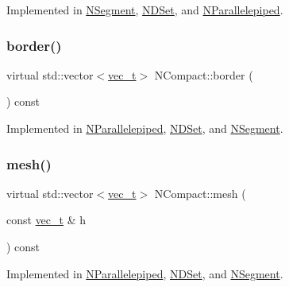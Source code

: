 Implemented in \mbox{\hyperlink{class_n_segment_a2fbe9d64e08f8aaa60d09ba8fe0ca2ba}{N\+Segment}}, \mbox{\hyperlink{class_n_d_set_a683386499ad6a9de65e0197f2846d8de}{N\+D\+Set}}, and \mbox{\hyperlink{class_n_parallelepiped_a57517e96bd3bc757cfa4e4d1d2768450}{N\+Parallelepiped}}.

\mbox{\label{class_n_compact_af7acc50099e80fc13ce32c97e6857308}} 
\subsubsection{\texorpdfstring{border()}{border()}}
{\footnotesize\ttfamily virtual std\+::vector$<$\mbox{\hyperlink{group___n_algebra_ga0a2cfc67e738a3d73e4f12098c4c07f6}{vec\+\_\+t}}$>$ N\+Compact\+::border (\begin{DoxyParamCaption}{ }\end{DoxyParamCaption}) const\hspace{0.3cm}{\ttfamily [pure virtual]}}



Implemented in \mbox{\hyperlink{class_n_parallelepiped_a6cc531927e40a95b48923b56406206d3}{N\+Parallelepiped}}, \mbox{\hyperlink{class_n_d_set_a3020476b78835439f6474845d30f00ff}{N\+D\+Set}}, and \mbox{\hyperlink{class_n_segment_a0ef102ed1c0751ae4a9a2e52bf0736da}{N\+Segment}}.

\mbox{\label{class_n_compact_ad4cdc60c75ca433c63f44ec13063e2fe}} 
\subsubsection{\texorpdfstring{mesh()}{mesh()}}
{\footnotesize\ttfamily virtual std\+::vector$<$\mbox{\hyperlink{group___n_algebra_ga0a2cfc67e738a3d73e4f12098c4c07f6}{vec\+\_\+t}}$>$ N\+Compact\+::mesh (\begin{DoxyParamCaption}\item[{const \mbox{\hyperlink{group___n_algebra_ga0a2cfc67e738a3d73e4f12098c4c07f6}{vec\+\_\+t}} \&}]{h }\end{DoxyParamCaption}) const\hspace{0.3cm}{\ttfamily [pure virtual]}}



Implemented in \mbox{\hyperlink{class_n_parallelepiped_a0f9ba9f6cab5d2c9472776e69f9aa78d}{N\+Parallelepiped}}, \mbox{\hyperlink{class_n_d_set_ae57fe6ad1422876fa4256a28c3a26a13}{N\+D\+Set}}, and \mbox{\hyperlink{class_n_segment_ad89a4122b800b15f465f5ca776394721}{N\+Segment}}.




